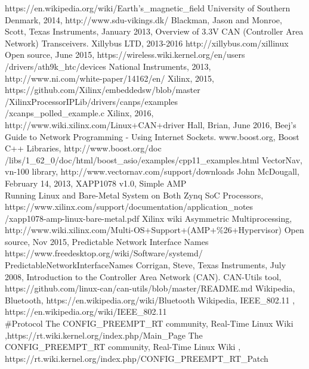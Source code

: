 \begin{thebibliography}{21} %
		https://en.wikipedia.org/wiki/Earth's\_magnetic\_field
		University of Southern Denmark, 2014, http://www.sdu-vikings.dk/
		Blackman, Jason and Monroe, Scott, Texas Instruments, January 2013, Overview of 3.3V CAN (Controller Area Network) Transceivers.
		Xillybus LTD, 2013-2016 http://xillybus.com/xillinux
		Open source, June 2015, https://wireless.wiki.kernel.org/en/users\\
		/drivers/ath9k\_htc/devices
		National Instruments, 2013, http://www.ni.com/white-paper/14162/en/
		Xilinx, 2015, https://github.com/Xilinx/embeddedsw/blob/master\\
		/XilinxProcessorIPLib/drivers/canps/examples\\
		/xcanps\_polled\_example.c
		Xilinx, 2016, http://www.wiki.xilinx.com/Linux+CAN+driver
		Hall, Brian, June 2016, Beej's Guide to Network Programming - Using Internet Sockets.
		www.boost.org, Boost C++ Libraries, http://www.boost.org/doc \\
		/libs/1\_62\_0/doc/html/boost\_asio/examples/cpp11\_examples.html
		VectorNav, vn-100 library, http://www.vectornav.com/support/downloads
		John McDougall, February 14, 2013, XAPP1078 v1.0, Simple AMP\\
		Running Linux and Bare-Metal System on Both Zynq SoC Processors,\\
		https://www.xilinx.com/support/documentation/application\_notes\\
		/xapp1078-amp-linux-bare-metal.pdf
		Xilinx wiki Asymmetric Multiprocessing,\\
		http://www.wiki.xilinx.com/Multi-OS+Support+(AMP+\%26+Hypervisor)
		Open source, Nov 2015, Predictable Network Interface Names \\
		https://www.freedesktop.org/wiki/Software/systemd/\\
		PredictableNetworkInterfaceNames
			Corrigan, Steve, Texas Instruments, July 2008, Introduction to the Controller Area Network (CAN).
			CAN-Utils tool, https://github.com/linux-can/can-utils/blob/master/README.md
			Wikipedia, Bluetooth, https://en.wikipedia.org/wiki/Bluetooth
			Wikipedia, IEEE\_802.11 , https://en.wikipedia.org/wiki/IEEE\_802.11\\
			\#Protocol
			The CONFIG\_PREEMPT\_RT community, Real-Time Linux Wiki ,https://rt.wiki.kernel.org/index.php/Main\_Page
			The CONFIG\_PREEMPT\_RT community, Real-Time Linux Wiki , https://rt.wiki.kernel.org/index.php/CONFIG\_PREEMPT\_RT\_Patch
\end{thebibliography}